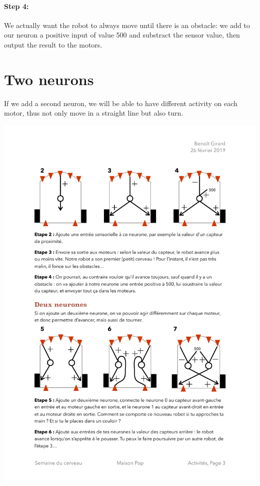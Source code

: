 \documentclass[12pt]{article}
\begin{document}
\paragraph{Step 4:} We actually want the robot to always move until there is an obstacle: we add to our neuron a positive input of value 500 and substract the sensor value, then output the result to the motors.

\section{Two neurons}

If we add a second neuron, we will be able to have different activity on each motor, thus not only move in a straight line but also turn.

\begin{center}
\includegraphics[width=\textwidth]{../Etapes5-7.pdf}
\end{center}
\end{document}
